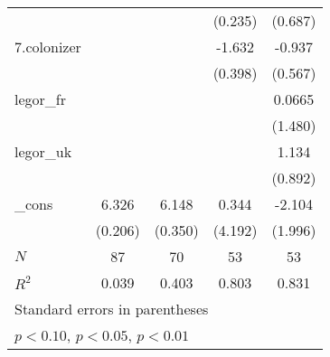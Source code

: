 {\begin{tabular}{l*{4}{c}}
            &                     &                     &     (0.235)         &     (0.687)         \\
[1em]
7.colonizer &                     &                     &      -1.632\sym{**} &      -0.937         \\
            &                     &                     &     (0.398)         &     (0.567)         \\
[1em]
legor\_fr    &                     &                     &                     &      0.0665         \\
            &                     &                     &                     &     (1.480)         \\
[1em]
legor\_uk    &                     &                     &                     &       1.134         \\
            &                     &                     &                     &     (0.892)         \\
[1em]
\_cons      &       6.326\sym{***}&       6.148\sym{***}&       0.344         &      -2.104         \\
            &     (0.206)         &     (0.350)         &     (4.192)         &     (1.996)         \\
\hline
\(N\)       &          87         &          70         &          53         &          53         \\
\(R^{2}\)   &       0.039         &       0.403         &       0.803         &       0.831         \\
\hline\hline
\multicolumn{5}{l}{\footnotesize Standard errors in parentheses}\\
\multicolumn{5}{l}{\footnotesize \sym{*} \(p<0.10\), \sym{**} \(p<0.05\), \sym{***} \(p<0.01\)}\\
\end{tabular}
}
